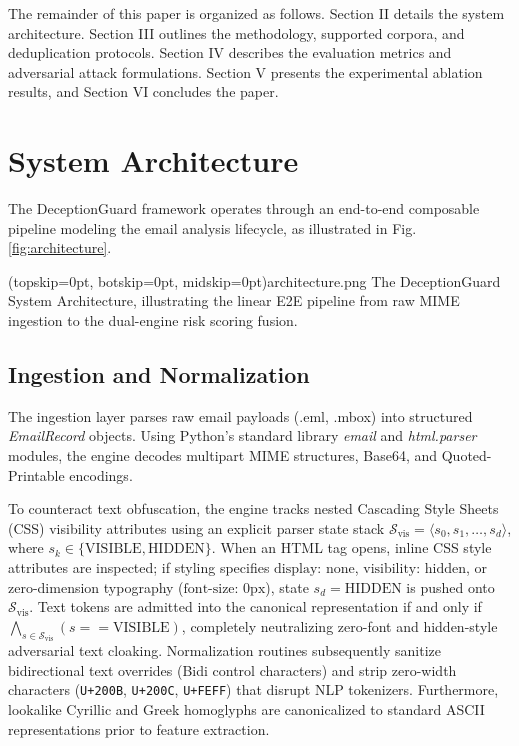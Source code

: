 \documentclass{ieeeaccess}
\begin{document}
The remainder of this paper is organized as follows. Section II details the system architecture. Section III outlines the methodology, supported corpora, and deduplication protocols. Section IV describes the evaluation metrics and adversarial attack formulations. Section V presents the experimental ablation results, and Section VI concludes the paper.

\section{System Architecture}
\label{sec:architecture}

The DeceptionGuard framework operates through an end-to-end composable pipeline modeling the email analysis lifecycle, as illustrated in Fig. \ref{fig:architecture}.

\Figure[t!](topskip=0pt, botskip=0pt, midskip=0pt){architecture.png}
{The DeceptionGuard System Architecture, illustrating the linear E2E pipeline from raw MIME ingestion to the dual-engine risk scoring fusion.\label{fig:architecture}}

\subsection{Ingestion and Normalization}
The ingestion layer parses raw email payloads (.eml, .mbox) into structured \textit{EmailRecord} objects. Using Python's standard library \textit{email} and \textit{html.parser} modules, the engine decodes multipart MIME structures, Base64, and Quoted-Printable encodings. 

To counteract text obfuscation, the engine tracks nested Cascading Style Sheets (CSS) visibility attributes using an explicit parser state stack $\mathcal{S}_{\text{vis}} = \langle s_0, s_1, \dots, s_d \rangle$, where $s_k \in \{\text{VISIBLE}, \text{HIDDEN}\}$. When an HTML tag opens, inline CSS style attributes are inspected; if styling specifies $\text{display: none}$, $\text{visibility: hidden}$, or zero-dimension typography ($\text{font-size: 0px}$), state $s_d = \text{HIDDEN}$ is pushed onto $\mathcal{S}_{\text{vis}}$. Text tokens are admitted into the canonical representation if and only if $\bigwedge_{s \in \mathcal{S}_{\text{vis}}} (s == \text{VISIBLE})$, completely neutralizing zero-font and hidden-style adversarial text cloaking. Normalization routines subsequently sanitize bidirectional text overrides (Bidi control characters) and strip zero-width characters (\texttt{U+200B}, \texttt{U+200C}, \texttt{U+FEFF}) that disrupt NLP tokenizers. Furthermore, lookalike Cyrillic and Greek homoglyphs are canonicalized to standard ASCII representations prior to feature extraction.
\end{document}
